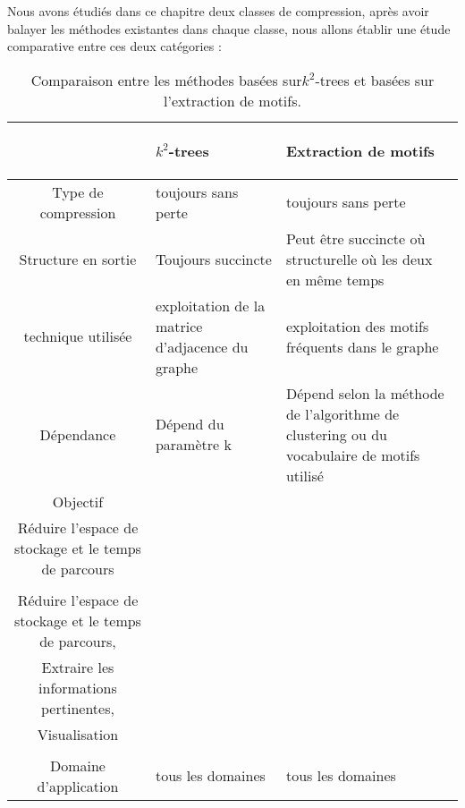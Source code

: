 Nous avons étudiés dans ce chapitre deux classes de compression, après avoir balayer les méthodes existantes dans chaque classe, nous allons établir une étude comparative entre ces deux catégories :
 
\begin{table}[H]
\begin{tabular}{|c|p{6cm}|p{6cm}|}

\hline & \begin{center}
\textbf{$k^2$-trees}
\end{center}     &  \begin{center} \textbf{Extraction de motifs} \end{center}  \\
										
										
\hline Type de compression & toujours sans perte & toujours sans perte \\
\hline Structure en sortie & Toujours succincte & Peut être succincte où structurelle où les deux en même temps\\

\hline technique utilisée & exploitation de la matrice d'adjacence du graphe & exploitation des motifs fréquents dans le graphe\\

\hline Dépendance & Dépend du paramètre k & Dépend selon la méthode de l'algorithme de clustering ou du vocabulaire de motifs utilisé  \\

\hline Objectif & 
\begin{minipage}[t]{0.35\textwidth}
  			Compression,\\
  			Réduire l'espace de stockage et le temps de parcours\\
  \end{minipage}
  &
  \begin{minipage}[t]{0.35\textwidth}
  			Compression,\\
  			Réduire l'espace de stockage et le temps de parcours,\\
  			Extraire les informations pertinentes, \\
  			Visualisation \\
  \end{minipage}
  \\
  \hline Domaine d'application & tous les domaines & tous les domaines \\
  \hline
\end{tabular}
									\caption{Comparaison entre les méthodes basées sur$k^2$-trees et basées sur l'extraction de motifs.}									
									
								\end{table}
